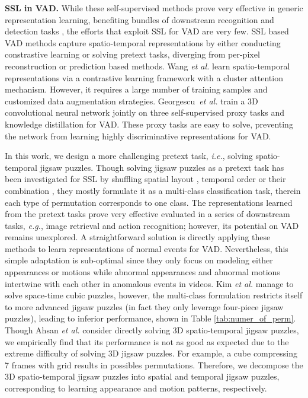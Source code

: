 \documentclass[runningheads]{llncs}
\begin{document}
\textbf{SSL in VAD.} While these self-supervised methods prove very effective in generic representation learning, benefiting bundles of downstream recognition and detection tasks \cite{chen2020simple, he2020momentum, pan2021videomoco, lorre2020temporal}, the efforts that exploit SSL for VAD are very few. SSL based VAD methods capture spatio-temporal representations by either conducting constrastive learning or solving pretext tasks, diverging from per-pixel reconstruction or prediction based methods. Wang \emph{et al.} \cite{wang2020cluster} learn spatio-temporal representations via a contrastive learning framework with a cluster attention mechanism. However, it requires a large number of training samples and customized data augmentation strategies. Georgescu~\emph{et al.} \cite{georgescu2021anomaly} train a 3D convolutional neural network jointly on three self-supervised proxy tasks and knowledge distillation for VAD. These proxy tasks are easy to solve, preventing the network from learning highly discriminative representations for VAD.

In this work, we design a more challenging pretext task, \emph{i.e.}, solving spatio-temporal jigsaw puzzles. Though solving jigsaw puzzles as a pretext task has been investigated for SSL by shuffling spatial layout \cite{noroozi2016unsupervised}, temporal order \cite{lee2017unsupervised} or their combination \cite{kim2019self}, they mostly formulate it as a multi-class classification task, therein each type of permutation corresponds to one class. The representations learned from the pretext tasks prove very effective evaluated in a series of downstream tasks, \emph{e.g.}, image retrieval and action recognition; however, its potential on VAD remains unexplored. A straightforward solution is directly applying these methods \cite{noroozi2016unsupervised, lee2017unsupervised} to learn representations of normal events for VAD. Nevertheless, this simple adaptation is sub-optimal since they only focus on modeling either appearances or motions while abnormal appearances and abnormal motions intertwine with each other in anomalous events in videos. Kim \emph{et al.} \cite{kim2019self} manage to solve space-time cubic puzzles, however, the multi-class formulation restricts itself to more advanced jigsaw puzzles (in fact they only leverage four-piece jigsaw puzzles), leading to inferior performance, shown in Table \ref{tab:numer_of_perm}. Though Ahsan \emph{et al.} \cite{ahsan2019video} consider directly solving 3D spatio-temporal jigsaw puzzles, we empirically find that its performance is not as good as expected due to the extreme difficulty of solving 3D jigsaw puzzles. For example, a cube compressing 7 frames with  grid results in  possibles permutations. Therefore, we decompose the 3D spatio-temporal jigsaw puzzles into spatial and temporal jigsaw puzzles, corresponding to learning appearance and motion patterns, respectively.
\end{document}
